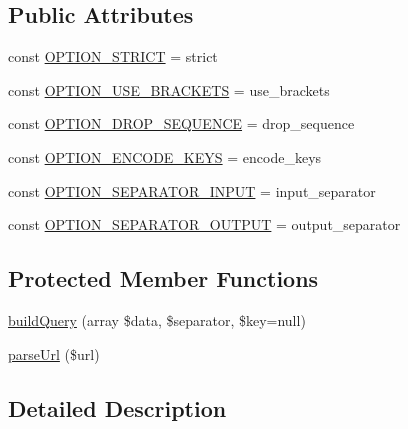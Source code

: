\subsection*{Public Attributes}
\begin{DoxyCompactItemize}
\item 
const \hyperlink{classNet__URL2_a766955033bdccec7175d0694df62a1a9}{O\+P\+T\+I\+O\+N\+\_\+\+S\+T\+R\+I\+C\+T} = \textquotesingle{}strict\textquotesingle{}
\item 
const \hyperlink{classNet__URL2_a864182f067e5df22055afc3a0dfe5a57}{O\+P\+T\+I\+O\+N\+\_\+\+U\+S\+E\+\_\+\+B\+R\+A\+C\+K\+E\+T\+S} = \textquotesingle{}use\+\_\+brackets\textquotesingle{}
\item 
const \hyperlink{classNet__URL2_af415684f1d85246c1132203142b86499}{O\+P\+T\+I\+O\+N\+\_\+\+D\+R\+O\+P\+\_\+\+S\+E\+Q\+U\+E\+N\+C\+E} = \textquotesingle{}drop\+\_\+sequence\textquotesingle{}
\item 
const \hyperlink{classNet__URL2_ae06ebc991de4ffe92644c5a8d37ad5ac}{O\+P\+T\+I\+O\+N\+\_\+\+E\+N\+C\+O\+D\+E\+\_\+\+K\+E\+Y\+S} = \textquotesingle{}encode\+\_\+keys\textquotesingle{}
\item 
const \hyperlink{classNet__URL2_af5b6f766fae9600b3938e33c32893bce}{O\+P\+T\+I\+O\+N\+\_\+\+S\+E\+P\+A\+R\+A\+T\+O\+R\+\_\+\+I\+N\+P\+U\+T} = \textquotesingle{}input\+\_\+separator\textquotesingle{}
\item 
const \hyperlink{classNet__URL2_a84719f522747f51638a9c8474d4abc39}{O\+P\+T\+I\+O\+N\+\_\+\+S\+E\+P\+A\+R\+A\+T\+O\+R\+\_\+\+O\+U\+T\+P\+U\+T} = \textquotesingle{}output\+\_\+separator\textquotesingle{}
\end{DoxyCompactItemize}
\subsection*{Protected Member Functions}
\begin{DoxyCompactItemize}
\item 
\hyperlink{classNet__URL2_a44d9ffd390931b846152080feb6a1740}{build\+Query} (array \$data, \$separator, \$key=null)
\item 
\hyperlink{classNet__URL2_a498acb2786e9f3074c6d52432de4c9d4}{parse\+Url} (\$url)
\end{DoxyCompactItemize}


\subsection{Detailed Description}


